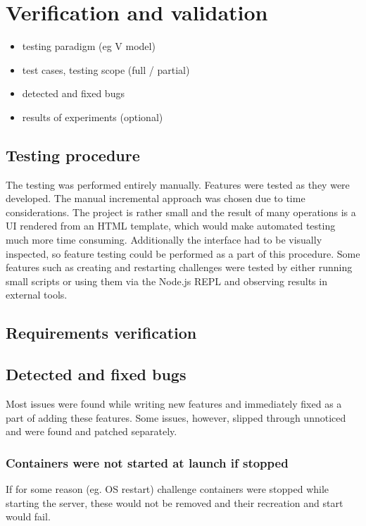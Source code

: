 \chapter{Verification and validation}
\begin{itemize}
	\item testing paradigm (eg V model)
	\item test cases, testing scope (full / partial)
	\item detected and fixed bugs
	\item results of experiments (optional)
\end{itemize}

\section{Testing procedure}

The testing was performed entirely manually. Features were tested as they were developed. The manual incremental approach was chosen due to time considerations. The project is rather small and the result of many operations is a UI rendered from an HTML template, which would make automated testing much more time consuming. Additionally the interface had to be visually inspected, so feature testing could be performed as a part of this procedure. Some features such as creating and restarting challenges were tested by either running small scripts or using them via the Node.js REPL and observing results in external tools.

\section{Requirements verification}


\section{Detected and fixed bugs}

Most issues were found while writing new features and immediately fixed as a part of adding these features. Some issues, however, slipped through unnoticed and were found and patched separately.

\subsection{Containers were not started at launch if stopped}

If for some reason (eg. OS restart) challenge containers were stopped while starting the server, these would not be removed and their recreation and start would fail.

